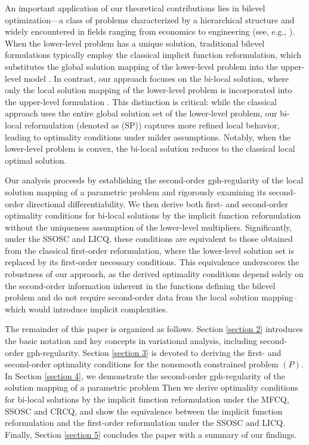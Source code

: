 \documentclass[11pt]{article}
\theoremstyle{definition}
\theoremstyle{remark}
\numberwithin{equation}{section}
\begin{document}
 An important application of our theoretical contributions lies in bilevel optimization—a class of problems characterized by a hierarchical structure and widely encountered in fields ranging from economics to engineering (see, e.g.,  \cite{Dempe 02,Dempe 06,Dempe 15, Dempe 20, Kunapuli 08}).
When the lower-level problem has a unique solution, traditional bilevel formulations typically employ the classical implicit function reformulation, which substitutes the global solution mapping of the lower-level problem into the upper-level model \cite{Falk 95,Dempe 92,  Mehlitz 17, Outrata, Shimizu 97, Zaslavski 12}.
In contrast, our approach focuses on the bi-local solution, where only the local solution mapping of the lower-level problem is incorporated into the upper-level formulation \cite{Liu 25}. This distinction is critical: while the classical approach  uses the entire global solution set of the lower-level problem, our bi-local reformulation (denoted as (SP)) captures more refined local behavior, leading to optimality conditions under milder assumptions.
Notably, when the lower-level problem is convex, the bi-local solution reduces to the classical local optimal solution.

Our analysis proceeds by establishing the second-order gph-regularity of the local solution mapping of a parametric problem and rigorously examining its second-order directional differentiability.
We then   derive both first- and second-order optimality conditions for bi-local
solutions  by the implicit function reformulation without the uniqueness assumption  of the lower-level multipliers.
Significantly,   under the SSOSC and LICQ,  these conditions are equivalent to those obtained from the classical first-order reformulation,  where the lower-level solution set is replaced by its first-order necessary conditions. This equivalence underscores the robustness of our approach, as the derived optimality conditions depend solely on the second-order information inherent in the functions defining the bilevel problem and do not require second-order data from the local solution mapping--which would introduce implicit complexities.









The remainder of this paper is organized as follows. Section \ref{section 2} introduces the basic notation and key concepts in variational analysis, including second-order gph-regularity. Section \ref{section 3} is devoted to deriving the first- and second-order optimality conditions for the nonsmooth constrained problem $(P)$.
In Section \ref{section 4}, we
demonstrate the  second-order gph-regularity of the solution mapping of a   parametric problem
Then we derive optimality conditions for bi-local solutions by the implicit function reformulation under the MFCQ, SSOSC and CRCQ,  and show the equivalence between the implicit function reformulation and the first-order reformulation under the SSOSC and LICQ.
Finally, Section \ref{section 5}  concludes the paper with a summary of our findings.
\end{document}
